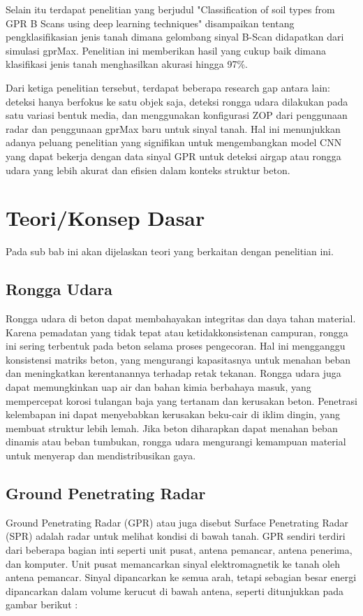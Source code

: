 Selain itu terdapat penelitian yang berjudul "Classification of soil types from GPR B Scans using deep learning techniques" \parencite{Barkataki2021} disampaikan tentang pengklasifikasian jenis tanah dimana gelombang sinyal B-Scan didapatkan dari simulasi gprMax. Penelitian ini memberikan hasil yang cukup baik dimana klasifikasi jenis tanah menghasilkan akurasi hingga 97\%.

Dari ketiga penelitian tersebut, terdapat beberapa research gap antara lain: deteksi hanya berfokus ke satu objek saja, deteksi rongga udara dilakukan pada satu variasi bentuk media, dan menggunakan konfigurasi ZOP dari penggunaan radar dan penggunaan gprMax baru untuk sinyal tanah. Hal ini menunjukkan adanya peluang penelitian yang signifikan untuk mengembangkan model CNN yang dapat bekerja dengan data sinyal GPR untuk deteksi airgap atau rongga udara yang lebih akurat dan efisien dalam konteks struktur beton.

\section{Teori/Konsep Dasar}
Pada sub bab ini akan dijelaskan teori yang berkaitan dengan penelitian ini.
\subsection{Rongga Udara}
Rongga udara di beton dapat membahayakan integritas dan daya tahan material. Karena pemadatan yang tidak tepat atau ketidakkonsistenan campuran, rongga ini sering terbentuk pada beton selama proses pengecoran. Hal ini mengganggu konsistensi matriks beton, yang mengurangi kapasitasnya untuk menahan beban dan meningkatkan kerentanannya terhadap retak tekanan. Rongga udara juga dapat memungkinkan uap air dan bahan kimia berbahaya masuk, yang mempercepat korosi tulangan baja yang tertanam dan kerusakan beton. Penetrasi kelembapan ini dapat menyebabkan kerusakan beku-cair di iklim dingin, yang membuat struktur lebih lemah. Jika beton diharapkan dapat menahan beban dinamis atau beban tumbukan, rongga udara mengurangi kemampuan material untuk menyerap dan mendistribusikan gaya\parencite{Zhu2007}.

\subsection{Ground Penetrating Radar}
Ground Penetrating Radar (GPR) atau juga disebut Surface Penetrating Radar (SPR) adalah radar untuk melihat kondisi di bawah tanah. GPR sendiri terdiri dari beberapa bagian inti seperti unit pusat, antena pemancar, antena penerima, dan komputer. Unit pusat memancarkan sinyal elektromagnetik ke tanah oleh antena pemancar. Sinyal dipancarkan ke semua arah, tetapi sebagian besar energi dipancarkan dalam volume kerucut di bawah antena, seperti ditunjukkan pada gambar berikut \parencite{Daniels2004}:

